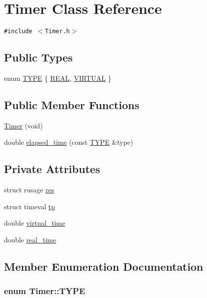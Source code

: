 \hypertarget{classTimer}{
\section{Timer Class Reference}
\label{classTimer}
}
{\tt \#include $<$Timer.h$>$}

\subsection*{Public Types}
\begin{CompactItemize}
\item 
enum \hyperlink{classTimer_f837f758756cde5bdb25c73253e3dd54}{TYPE} \{ \hyperlink{classTimer_f837f758756cde5bdb25c73253e3dd546040915dadd8d1a608e7472b47ebbc91}{REAL}, 
\hyperlink{classTimer_f837f758756cde5bdb25c73253e3dd54e8780921637fe85eab01dda52d0fe2bc}{VIRTUAL}
 \}
\end{CompactItemize}
\subsection*{Public Member Functions}
\begin{CompactItemize}
\item 
\hyperlink{classTimer_f866f8d58d5ed1da7a0c61df4975be3e}{Timer} (void)
\item 
double \hyperlink{classTimer_6ae79acba6fa12eb3c47ad135d4f5a03}{elapsed\_\-time} (const \hyperlink{classTimer_f837f758756cde5bdb25c73253e3dd54}{TYPE} \&type)
\end{CompactItemize}
\subsection*{Private Attributes}
\begin{CompactItemize}
\item 
struct rusage \hyperlink{classTimer_76c056e0461978783ca9c47af3d953d1}{res}
\item 
struct timeval \hyperlink{classTimer_f9d8a85efc3809ca6223ad60bbda6e5a}{tp}
\item 
double \hyperlink{classTimer_1c89ce2e92a2f63cc2309ed9ac765905}{virtual\_\-time}
\item 
double \hyperlink{classTimer_845cc39afdf6c74225d2d5580de49208}{real\_\-time}
\end{CompactItemize}


\subsection{Member Enumeration Documentation}
\hypertarget{classTimer_f837f758756cde5bdb25c73253e3dd54}{
\subsubsection{\setlength{\rightskip}{0pt plus 5cm}enum {\bf Timer::TYPE}}}
\label{classTimer_f837f758756cde5bdb25c73253e3dd54}


